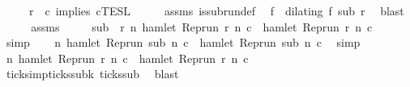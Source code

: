 \begin{isabellebody}
\ \ \ \ \ {\isacartoucheopen}r\ {\isasymin}\ {\isasymlbrakk}c\ implies\ c\isactrlsub T\isactrlsub E\isactrlsub S\isactrlsub L{\isacartoucheclose}\isanewline
%
\isadelimproof
%
\endisadelimproof
%
\isatagproof
{}\isamarkupfalse%
\ {\isacharminus}\isanewline
\ \ \isamarkupfalse%
\ assms{\isacharparenleft}{}{\isacharparenright}\ is{\isacharunderscore}subrun{\isacharunderscore}def\ \isamarkupfalse%
\ f\ \ {\isacartoucheopen}dilating\ f\ sub\ r{\isacartoucheclose}\ \isamarkupfalse%
\ blast\isanewline
\ \ \isamarkupfalse%
\ \isamarkupfalse%
\ assms{\isacharparenleft}{}{\isacharparenright}\ \isamarkupfalse%
\isanewline
\ \ \ \ {\isacartoucheopen}sub\ {\isasymin}\ {\isacharbraceleft}r{\isachardot}\ {\isasymforall}n{\isachardot}\ hamlet\ {\isacharparenleft}{\isacharparenleft}Rep{\isacharunderscore}run\ r{\isacharparenright}\ n\ c\ {\isasymlongrightarrow}\ hamlet\ {\isacharparenleft}{\isacharparenleft}Rep{\isacharunderscore}run\ r{\isacharparenright}\ n\ c\ \isamarkupfalse%
\ simp\isanewline
\ \ \isamarkupfalse%
\ {\isacartoucheopen}{\isasymforall}n{\isachardot}\ hamlet\ {\isacharparenleft}{\isacharparenleft}Rep{\isacharunderscore}run\ sub{\isacharparenright}\ n\ c\ {\isasymlongrightarrow}\ hamlet\ {\isacharparenleft}{\isacharparenleft}Rep{\isacharunderscore}run\ sub{\isacharparenright}\ n\ c\ \isamarkupfalse%
\ simp\isanewline
\ \ \isamarkupfalse%
\ \isamarkupfalse%
\ {\isacartoucheopen}{\isasymforall}n{\isachardot}\ hamlet\ {\isacharparenleft}{\isacharparenleft}Rep{\isacharunderscore}run\ r{\isacharparenright}\ n\ c\ {\isasymlongrightarrow}\ hamlet\ {\isacharparenleft}{\isacharparenleft}Rep{\isacharunderscore}run\ r{\isacharparenright}\ n\ c\isanewline
\ \ \ \ \isamarkupfalse%
\ ticks{\isacharunderscore}imp{\isacharunderscore}ticks{\isacharunderscore}subk\ ticks{\isacharunderscore}sub\ \isamarkupfalse%
\ blast\isanewline
\ \ \isamarkupfalse%

\end{isabellebody}
